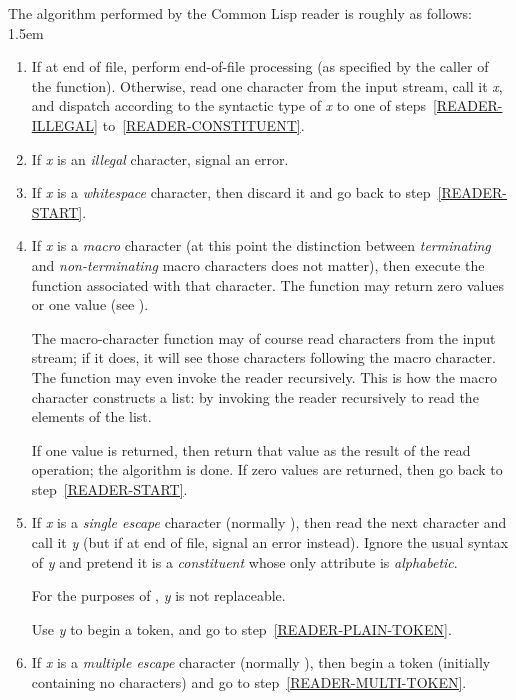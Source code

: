 The algorithm performed by the Common Lisp reader is roughly as follows:
\begingroup\leftmargini 1.5em
\begin{enumerate}
\item
If at end of file, perform end-of-file processing (as specified
by the caller of the  function).
Otherwise,
read one character from the input stream, call it \emph{x}, and
dispatch according to the syntactic type of \emph{x} to one
of steps~\ref{READER-ILLEGAL} to~\ref{READER-CONSTITUENT}.
\label{READER-START}

\item
If \emph{x} is an \emph{illegal} character, signal an error.
\label{READER-ILLEGAL}

\item
If \emph{x} is a \emph{whitespace} character,
then discard it and go back to step~\ref{READER-START}.
\label{READER-WHITESPACE}

\item
If \emph{x} is a \emph{macro} character (at this point the
distinction between \emph{terminating} and \emph{non-terminating} macro characters
does not matter), then execute the function associated
with that character.  The function may return zero values or one value
(see ).

The macro-character function may of course read characters from the input
stream; if it does, it will see those characters following the macro
character.  The function may even invoke the reader recursively.
This is how the macro character \cd{(} constructs a list:
by invoking the reader recursively to read the elements of the list.

If one value is returned, then return that value as the result of the
read operation; the algorithm is done.
If zero values are returned, then go back to step~\ref{READER-START}.

\item
If \emph{x} is a \emph{single escape} character (normally \cd{{\Xbackslash}}),
then read the next character and call it \emph{y}
(but if at end of file, signal an error instead).
Ignore the usual syntax of \emph{y}
and pretend it is a \emph{constituent} whose only attribute is
\emph{alphabetic}.

For the purposes of , \emph{y} is not replaceable.

Use \emph{y} to begin a token, and go to step~\ref{READER-PLAIN-TOKEN}.

\item
If \emph{x} is a \emph{multiple escape} character (normally \cd{|}),
then begin a token (initially
containing no characters) and go to step~\ref{READER-MULTI-TOKEN}.


\end{enumerate}
